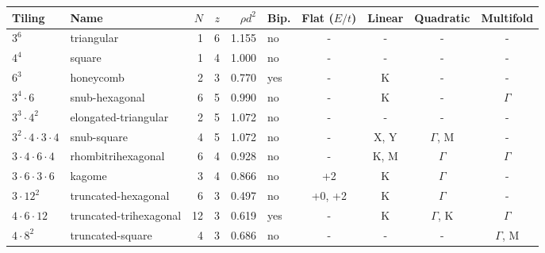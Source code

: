 \begin{tabular}{llrrrlcccc}
\toprule
Tiling & Name & $N$ & $z$ & $\rho d^2$ & Bip. & Flat ($E/t$) & Linear & Quadratic & Multifold \\
\midrule
$3^6$ & triangular & 1 & 6 & 1.155 & no & - & - & - & - \\
$4^4$ & square & 1 & 4 & 1.000 & no & - & - & - & - \\
$6^3$ & honeycomb & 2 & 3 & 0.770 & yes & - & K & - & - \\
$3^4\!\cdot\!6$ & snub-hexagonal & 6 & 5 & 0.990 & no & - & K & - & $\Gamma$ \\
$3^3\!\cdot\!4^2$ & elongated-triangular & 2 & 5 & 1.072 & no & - & - & - & - \\
$3^2\!\cdot\!4\!\cdot\!3\!\cdot\!4$ & snub-square & 4 & 5 & 1.072 & no & - & X, Y & $\Gamma$, M & - \\
$3\!\cdot\!4\!\cdot\!6\!\cdot\!4$ & rhombitrihexagonal & 6 & 4 & 0.928 & no & - & K, M & $\Gamma$ & $\Gamma$ \\
$3\!\cdot\!6\!\cdot\!3\!\cdot\!6$ & kagome & 3 & 4 & 0.866 & no & +2 & K & $\Gamma$ & - \\
$3\!\cdot\!12^2$ & truncated-hexagonal & 6 & 3 & 0.497 & no & +0, +2 & K & $\Gamma$ & - \\
$4\!\cdot\!6\!\cdot\!12$ & truncated-trihexagonal & 12 & 3 & 0.619 & yes & - & K & $\Gamma$, K & $\Gamma$ \\
$4\!\cdot\!8^2$ & truncated-square & 4 & 3 & 0.686 & no & - & - & - & $\Gamma$, M \\
\bottomrule
\end{tabular}
